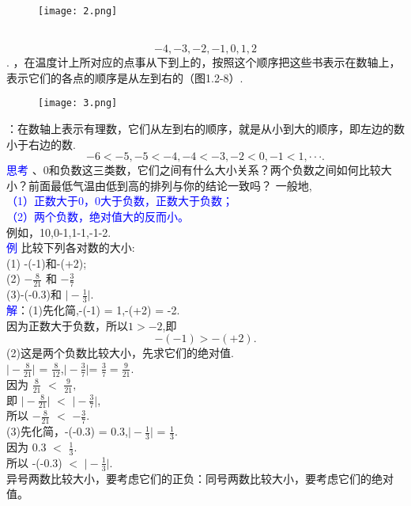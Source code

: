 \documentclass[UTF8]{article}
\begin{document}
	\begin{figure}[ht]
		\centering
		\texttt{[image: 2.png]}
	\end{figure}
	\\
	$$-4,-3,-2,-1,0,1,2$$.
	，在温度计上所对应的点事从下到上的，按照这个顺序把这些书表示在数轴上，表示它们的各点的顺序是从左到右的（图1.2-8）.
	\begin{figure}[ht]
		\centering
		\texttt{[image: 3.png]}
	\end{figure}
	：在数轴上表示有理数，它们从左到右的顺序，就是从小到大的顺序，即左边的数小于右边的数.
	$$-6<-5,-5<-4,-4<-3,-2<0,-1<1,···.$$
	\textcolor{blue}{思考}
	、0和负数这三类数，它们之间有什么大小关系？两个负数之间如何比较大小？前面最低气温由低到高的排列与你的结论一致吗？
	一般地,\\
	\textcolor{blue}{（1）正数大于0，0大于负数，正数大于负数；}\\
	\textcolor{blue}{（2）两个负数，绝对值大的反而小。}\\
	例如，10,0-1,1-1,-1-2.\\
	\textcolor{blue}{例} 比较下列各对数的大小:\\
	(1) -(-1)和-(+2); \\
	(2) $-\frac{8}{21}$ 和 $-\frac{3}{7}$\\     
	(3)-(-0.3)和 $\vert -\frac{1}{3} \vert$.\\
	\textcolor{blue}{解}：(1)先化简,-(-1) = 1,-(+2) = -2.\\
	因为正数大于负数，所以$1> -2$,即\\
	$$-(-1)>-(+2).$$
	(2)这是两个负数比较大小，先求它们的绝对值.\\
	$\vert -\frac{8}{21} \vert$ = $\frac{8}{12}$,$\vert -\frac{3}{7} \vert $= $\frac{3}{7}=\frac{9}{21}$.\\
	因为 $\frac{8}{21}$ $<$ $\frac{9}{21},$\\
	即	$\vert -\frac{8}{21} \vert $ $<$ $\vert -\frac{3}{7} \vert$,\\
	所以 $-\frac{8}{21}  $ $<$ $ -\frac{3}{7}.$\\
	(3)先化简，-(-0.3) = 0.3,$\vert -\frac{1}{3} \vert$ = $\frac{1}{3}.$\\
	因为 0.3  $<$ $\frac{1}{3}.$\\
	所以 -(-0.3)  $<$ $ \vert -\frac{1}{3} \vert.$\\
	\indent 异号两数比较大小，要考虑它们的正负：同号两数比较大小，要考虑它们的绝对值。\\
\end{document}
